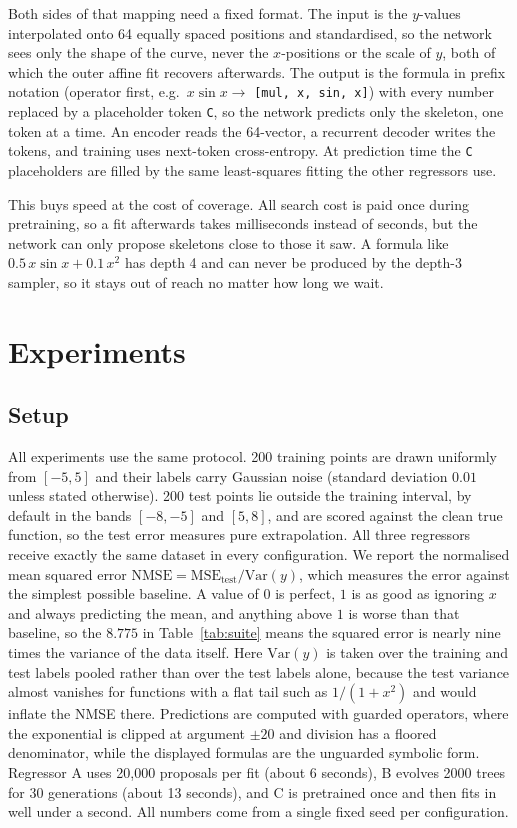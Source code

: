 \documentclass{article}
\begin{document}
Both sides of that mapping need a fixed format. The input is the
$y$-values interpolated onto 64 equally spaced positions and
standardised, so the network sees only the shape of the curve, never the
$x$-positions or the scale of $y$, both of which the outer affine fit
recovers afterwards. The output is the formula in prefix notation
(operator first, e.g.\ $x\sin x \to$ \texttt{[mul, x, sin, x]}) with
every number replaced by a placeholder token \texttt{C}, so the network
predicts only the skeleton, one token at a time. An encoder reads the
64-vector, a recurrent decoder writes the tokens, and training uses
next-token cross-entropy. At prediction time the \texttt{C} placeholders
are filled by the same least-squares fitting the other regressors use.

This buys speed at the cost of coverage. All search cost is paid once
during pretraining, so a fit afterwards takes milliseconds instead of
seconds, but the network can only propose skeletons close to those it
saw. A formula like $0.5\,x \sin x + 0.1\,x^2$ has depth 4 and can never
be produced by the depth-3 sampler, so it stays out of reach no matter
how long we wait.

\section{Experiments}

\subsection{Setup}

All experiments use the same protocol. 200 training points are drawn
uniformly from $[-5, 5]$ and their labels carry Gaussian noise (standard
deviation $0.01$ unless stated otherwise). 200 test points lie outside
the training interval, by default in the bands $[-8,-5]$ and $[5,8]$,
and are scored against the clean true function, so the test error
measures pure extrapolation. All three regressors receive exactly the
same dataset in every configuration. We report the normalised mean
squared error $\mathrm{NMSE} = \mathrm{MSE}_{\mathrm{test}} / \mathrm{Var}(y)$,
which measures the error against the simplest possible baseline. A value
of $0$ is perfect, $1$ is as good as ignoring $x$ and always predicting
the mean, and anything above $1$ is worse than that baseline, so the
$8.775$ in Table~\ref{tab:suite} means the squared error is nearly nine
times the variance of the data itself. Here $\mathrm{Var}(y)$ is taken
over the training and test labels pooled rather than over the test
labels alone, because the test variance almost vanishes for functions
with a flat tail such as $1/(1+x^2)$ and would inflate the NMSE there.
Predictions are computed with guarded operators, where the exponential
is clipped at argument $\pm 20$ and division has a floored denominator,
while the displayed formulas are the unguarded symbolic form. Regressor
A uses 20{,}000 proposals per fit (about 6 seconds), B evolves 2000
trees for 30 generations (about 13 seconds), and C is pretrained once
and then fits in well under a second. All numbers come from a single
fixed seed per configuration.
\end{document}
